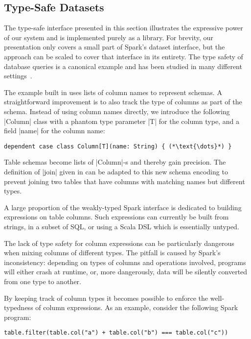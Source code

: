 \subsection{Type-Safe Datasets}

The type-safe interface presented in this section illustrates the expressive power of our system and is implemented purely as a library.
For brevity, our presentation only covers a small part of Spark's dataset interface, but the approach can be scaled to cover that interface in its entirety.
The type safety of database queries is a canonical example and has been studied in many different settings~\citep{leijen1999domain, kazerounian2019type, meijer2006linq, chlipala2010ur}.

The example built in  uses lists of column names to represent schemas.
A straightforward improvement is to also track the type of columns as part of the schema.
Instead of using column names directly, we introduce the following |Column| class with a phantom type parameter |T| for the column type, and a field |name| for the column name:

\begin{lstlisting}
dependent case class Column[T](name: String) { (*\text{\dots}*) }
\end{lstlisting}

Table schemas become lists of |Column|-s and thereby gain precision.
The definition of |join| given in  can be adapted to this new schema encoding to prevent joining two tables that have columns with matching names but different types.

A large proportion of the weakly-typed Spark interface is dedicated to building expressions on table columns.
Such expressions can currently be built from strings, in a subset of SQL, or using a Scala DSL which is essentially untyped.

The lack of type safety for column expressions can be particularly dangerous when mixing columns of different types.
The pitfall is caused by Spark's inconsistency: depending on types of columns and operations involved, programs will either crash at runtime, or, more dangerously, data will be silently converted from one type to another.

By keeping track of column types it becomes possible to enforce the well-typedness of column expressions.
As an example, consider the following Spark program:

\begin{lstlisting}
table.filter(table.col("a") + table.col("b") === table.col("c"))
\end{lstlisting}

